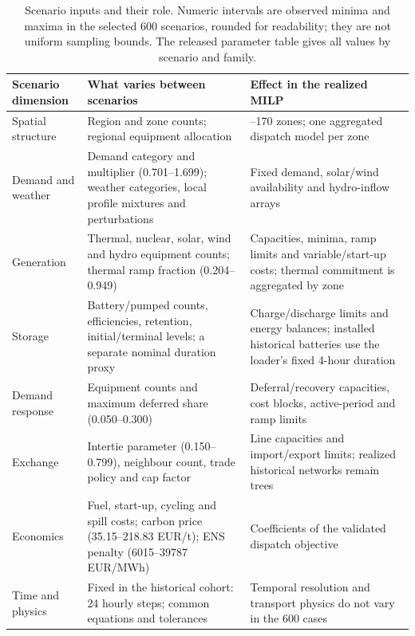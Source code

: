 \begin{table}[htbp]\centering\small
\begin{tabular}{>{\raggedright\arraybackslash}p{.19\linewidth}>{\raggedright\arraybackslash}p{.37\linewidth}>{\raggedright\arraybackslash}p{.33\linewidth}}\toprule
Scenario dimension & What varies between scenarios & Effect in the realized MILP\\\midrule
Spatial structure & Region and zone counts; regional equipment allocation & 4--170 zones; one aggregated dispatch model per zone\\
Demand and weather & Demand category and multiplier (0.701--1.699); weather categories, local profile mixtures and perturbations & Fixed demand, solar/wind availability and hydro-inflow arrays\\
Generation & Thermal, nuclear, solar, wind and hydro equipment counts; thermal ramp fraction (0.204--0.949) & Capacities, minima, ramp limits and variable/start-up costs; thermal commitment is aggregated by zone\\
Storage & Battery/pumped counts, efficiencies, retention, initial/terminal levels; a separate nominal duration proxy & Charge/discharge limits and energy balances; installed historical batteries use the loader's fixed 4-hour duration\\
Demand response & Equipment counts and maximum deferred share (0.050--0.300) & Deferral/recovery capacities, cost blocks, active-period and ramp limits\\
Exchange & Intertie parameter (0.150--0.799), neighbour count, trade policy and cap factor & Line capacities and import/export limits; realized historical networks remain trees\\
Economics & Fuel, start-up, cycling and spill costs; carbon price (35.15--218.83 EUR/t); ENS penalty (6015--39787 EUR/MWh) & Coefficients of the validated dispatch objective\\
Time and physics & Fixed in the historical cohort: 24 hourly steps; common equations and tolerances & Temporal resolution and transport physics do not vary in the 600 cases\\\bottomrule
\end{tabular}
\caption{Scenario inputs and their role. Numeric intervals are observed minima and maxima in the selected 600 scenarios, rounded for readability; they are not uniform sampling bounds. The released parameter table gives all values by scenario and family.}
\label{tab:scenario_parameters}
\end{table}

